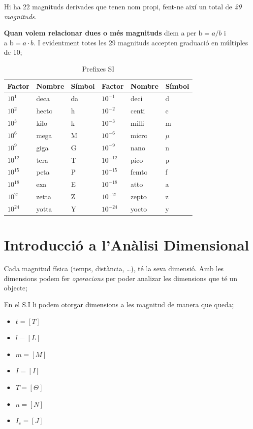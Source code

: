 \documentclass[12pt]{article}
\begin{document}
Hi ha 22 magnituds derivades que tenen nom propi, fent-ne així un total de \textit{29 magnituds}.

\textbf{Quan volem relacionar dues o més magnituds} diem $\text{a per b} = a/b$ i $\text{a b} = a\cdot b$. I evidentment totes les 29 magnituds accepten graduació en múltiples de 10;

\begin{table}[h]
\centering
\caption{Prefixes SI}
\begin{tabular}{lll lll}
\hline
Factor & Nombre & Símbol & Factor & Nombre & Símbol \\
\hline
$10^{1}$  & deca  & da & $10^{-1}$  & deci  & d \\
$10^{2}$  & hecto & h  & $10^{-2}$  & centi & c \\
$10^{3}$  & kilo  & k  & $10^{-3}$  & milli & m \\
$10^{6}$  & mega  & M  & $10^{-6}$  & micro & $\mu$ \\
$10^{9}$  & giga  & G  & $10^{-9}$  & nano  & n \\
$10^{12}$ & tera  & T  & $10^{-12}$ & pico  & p \\
$10^{15}$ & peta  & P  & $10^{-15}$ & femto & f \\
$10^{18}$ & exa   & E  & $10^{-18}$ & atto  & a \\
$10^{21}$ & zetta & Z  & $10^{-21}$ & zepto & z \\
$10^{24}$ & yotta & Y  & $10^{-24}$ & yocto & y \\
\hline
\end{tabular}
\end{table}

\section{Introducció a l'Anàlisi Dimensional}

Cada magnitud física (temps, distància, \dots), té la seva dimensió. Amb les dimensions podem fer \textit{operacions} per poder analizar les dimensions que té un objecte;

En el S.I li podem otorgar dimensions a les magnitud de manera que queda;

\begin{itemize}
    \item $t = [T]$
    \item $l = [L]$
    \item $m = [M]$
    \item $I = [I]$
    \item $T = [\Theta]$
    \item $n = [N]$
    \item $I_e = [J]$
\end{itemize}
\end{document}
